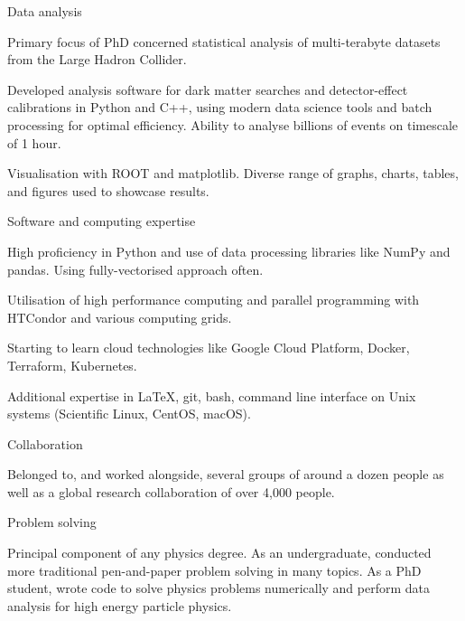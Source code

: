 
\begin{cventries}

    \cventry
    {} %
    {Data analysis} %
    {} %
    {} %
    {
      \begin{cvitems}
        \item {Primary focus of PhD concerned statistical analysis of multi-terabyte datasets from the Large Hadron Collider.}
        \item {Developed analysis software for dark matter searches and detector-effect calibrations in Python and C++, using modern data science tools and batch processing for optimal efficiency. Ability to analyse billions of events on timescale of 1 hour.}
        \item{Visualisation with ROOT and matplotlib. Diverse range of graphs, charts, tables, and figures used to showcase results.}
        \end{cvitems}
    }

    \cventry
    {} %
    {Software and computing expertise} %
    {} %
    {} %
    {
      \begin{cvitems}
        \item {High proficiency in Python and use of data processing libraries like NumPy and pandas. Using fully-vectorised approach often.}
        \item {Utilisation of high performance computing and parallel programming with HTCondor and various computing grids.}
        \item {Starting to learn cloud technologies like Google Cloud Platform, Docker, Terraform, Kubernetes.}
        \item{Additional expertise in LaTeX, git, bash, command line interface on Unix systems (Scientific Linux, CentOS, macOS).}
        \end{cvitems}
    }

    \cventry
    {}
    {Collaboration}
    {}
    {}
    {
      \begin{cvitems}
        \item {Belonged to, and worked alongside, several groups of around a dozen people as well as a global research collaboration of over 4,000 people.}
        \end{cvitems}
    }

    \cventry
    {}
    {Problem solving}
    {}
    {}
    {
      \begin{cvitems}
        \item {Principal component of any physics degree. As an undergraduate, conducted more traditional pen-and-paper problem solving in many topics. As a PhD student, wrote code to solve physics problems numerically and perform data analysis for high energy particle physics.}
        \end{cvitems}
    }


\end{cventries}
